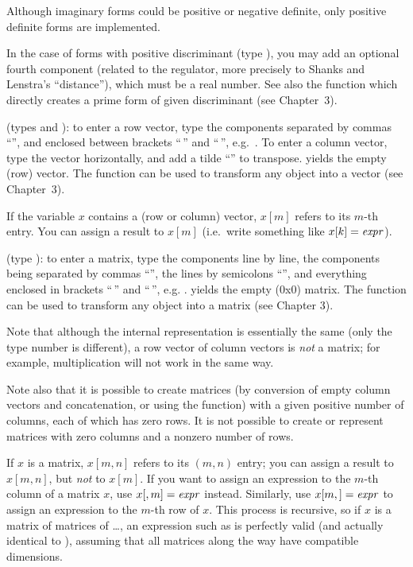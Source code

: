 Although imaginary forms could be positive or negative definite, only
positive definite forms are implemented.

In the case of forms with positive discriminant (type ), you may add
an optional fourth component (related to the regulator, more precisely to
Shanks and Lenstra's ``distance''), which must be a real number. See also the
function  which directly creates a prime form of given
discriminant (see Chapter~3).

 (types
 and ): to enter a row vector, type the components
separated by commas ``\kbd{,}'', and enclosed between brackets
``\kbd{[}$\,$'' and ``$\,$\kbd{]}'', e.g.~\kbd{[1,2,3]}. To enter a column
vector, type the vector horizontally, and add a tilde ``\til'' to transpose.
\kbd{[ ]} yields the empty (row) vector. The function  can be used
to transform any object into a vector (see Chapter~3).

If the variable $x$ contains a (row or column) vector, $x[m]$ refers to its
$m$-th entry. You can assign a result to $x[m]$ (i.e.~write something like
$x[k]=\hbox{\it expr\/}$).

 (type ): to enter a matrix, type
the components line by line, the components being separated by commas
``\kbd{,}'', the lines by semicolons ``\kbd{;}'', and everything enclosed in
brackets ``\kbd{[}$\,$'' and ``$\,$\kbd{]}'', e.g. \kbd{[x,y; z,t; u,v]}.
\kbd{[ ; ]} yields the empty (0x0) matrix. The function  can be used
to transform any object into a matrix (see Chapter 3).

Note that although the internal representation is essentially the same (only
the type number is different), a row vector of column vectors is \emph{not} a
matrix; for example, multiplication will not work in the same way.

Note also that it is possible to create matrices (by conversion of empty
column vectors and concatenation, or using the  function) with a
given positive number of columns, each of which has zero rows. It is not
possible to create or represent matrices with zero columns and a nonzero
number of rows.

If $x$ is a matrix, $x[m,n]$ refers to its $(m,n)$ entry; you can assign a
result to $x[m,n]$, but \emph{not} to $x[m]$. If you want to assign an
expression to the $m$-th column of a matrix $x$, use $x[,m]=\hbox{\it expr\/}$
instead. Similarly, use $x[m,]=\hbox{\it expr\/}$ to assign an expression to the
$m$-th row of $x$. This process is recursive, so if $x$ is a matrix of
matrices of \dots, an expression such as  is perfectly
valid (and actually identical to ), assuming that all
matrices along the way have compatible dimensions.


